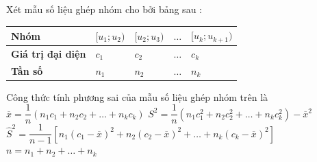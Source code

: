 \begin{ex}%
	Xét mẫu số liệu ghép nhóm cho bởi bảng sau :
	\begin{center}
		\setlength{\extrarowheight}{2pt}
		\newcommand{\PreBackslash}[1]{\let\temp=\\#1\let\\=\temp}
		\let\PBS=\PreBackslash
		\begin{tabular}{|>{\PBS\centering}m{4cm}|>{\PBS\centering}m{2cm}|>{\PBS\centering}m{2cm}| >{\PBS\centering}m{2cm}|>{\PBS\centering}m{2cm}|}\hline
			\textbf{Nhóm} &$[u_1;u_2)$&$[u_2;u_3)$&$\ldots$&$[u_k;u_{k+1})$\\
			\hline
			\textbf{Giá trị đại diện}&$c_1$&$c_2$&$\ldots$&$c_k$\\
			\hline
			\textbf{Tần số}&$n_1$&$n_2$&$\ldots$&$n_k$\\
			\hline
		\end{tabular}
	\end{center}
	Công thức tính phương sai của mẫu số liệu ghép nhóm trên là
	\choice
	{$\overline{x}= \dfrac{1}{n}\left( n_1c_1+n_2c_2+\ldots+n_kc_k\right)$}
	{\True $S^2= \dfrac{1}{n}\left( n_1c_1^2+n_2c_2^2+\ldots+n_kc_k^2\right)-\overline{x}^2$}
	{${\widehat{S}}^2= \dfrac{1}{n-1}\left[ n_1\left(c_1-\overline{x}\right) ^2+n_2\left( c_2-\overline{x}\right) ^2+\ldots+n_k\left( c_k-\overline{x}\right)^2\right]$}
	{$n=n_1+n_2+\ldots+n_k$}
\end{ex}

